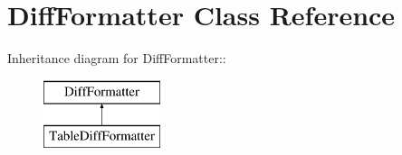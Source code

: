 \hypertarget{classDiffFormatter}{
\section{DiffFormatter Class Reference}
\label{classDiffFormatter}
}
Inheritance diagram for DiffFormatter::\begin{figure}[H]
\begin{center}
\leavevmode
\includegraphics[height=2cm]{classDiffFormatter}
\end{center}
\end{figure}
